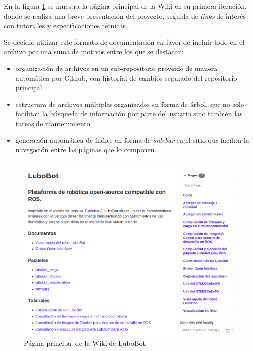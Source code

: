 

En la figura \ref{fig:wiki} se muestra la página principal de la Wiki en su primera iteración, donde se realiza una breve presentación del proyecto, seguida de \textit{links} de interés con tutoriales y especificaciones técnicas.

Se decidió utilizar este formato de documentación en favor de incluir todo en el archivo  por una suma de motivos entre los que se destacan:

\begin{itemize}
  \item organización de archivos en un sub-repositorio proveído de manera automática por Github, con historial de cambios separado del repositorio principal.
  \item estructura de archivos múltiples organizados en forma de árbol, que no solo facilitan la búsqueda de información por parte del usuario sino también las tareas de mantenimiento.
  \item generación automática de índice en forma de \textit{sidebar} en el sitio que facilita la navegación entre las páginas que lo componen.
\end{itemize}

\newpage

\begin{figure}[ht]
  \centering
  \includegraphics[scale=0.5]{./Figures/wiki.png}
  \caption{Página principal de la Wiki de LuboBot.\protect\footnotemark}
  \label{fig:wiki}
\end{figure}

